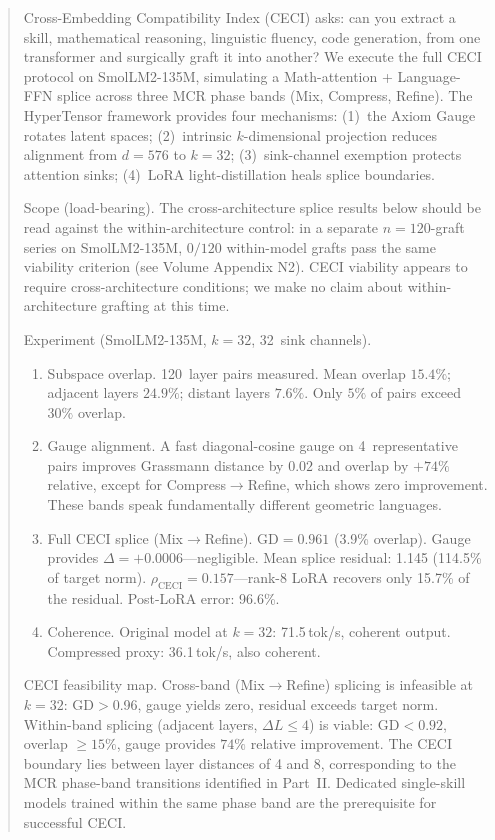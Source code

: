 \documentclass[11pt]{article}
\begin{document}
\hypertensorbanner

\begin{abstract}
\noindent
Cross-Embedding Compatibility Index (CECI) asks: can you extract a
skill, mathematical reasoning, linguistic fluency, code
generation, from one transformer and surgically graft it into another?
We execute the full CECI protocol on SmolLM2-135M, simulating a
Math-attention + Language-FFN splice across three MCR phase bands
(Mix, Compress, Refine). The HyperTensor framework provides four
mechanisms: (1)~the Axiom Gauge rotates latent spaces; (2)~intrinsic
$k$-dimensional projection reduces alignment from $d{=}576$ to
$k{=}32$; (3)~sink-channel exemption protects attention sinks;
(4)~LoRA light-distillation heals splice boundaries.

Scope (load-bearing). The cross-architecture splice
results below should be read against the within-architecture
control: in a separate $n{=}120$-graft series on SmolLM2-135M,
$0/120$ within-model grafts pass the same viability criterion
(see Volume Appendix N2). CECI viability appears to require
cross-architecture conditions; we make no claim about
within-architecture grafting at this time.

Experiment (SmolLM2-135M, $k=32$, 32~sink channels).
\begin{enumerate}
\item Subspace overlap. 120~layer pairs measured. Mean
 overlap $15.4\%$; adjacent layers $24.9\%$; distant layers
 $7.6\%$. Only $5\%$ of pairs exceed $30\%$ overlap.
\item Gauge alignment. A fast diagonal-cosine gauge on
 4~representative pairs improves Grassmann distance by $0.02$
 and overlap by $+74\%$ relative, except for
 Compress$\to$Refine, which shows zero improvement.
 These bands speak fundamentally different geometric languages.
\item Full CECI splice (Mix$\to$Refine). GD$=0.961$
 (3.9\% overlap). Gauge provides $\Delta{=}{+}0.0006$---negligible.
 Mean splice residual: 1.145 (114.5\% of target norm).
 $\rho_{\mathrm{CECI}}{=}0.157$---rank-8 LoRA recovers only
 15.7\% of the residual. Post-LoRA error: 96.6\%.
\item Coherence. Original model at $k{=}32$: 71.5\,tok/s,
 coherent output. Compressed proxy: 36.1\,tok/s, also coherent.
\end{enumerate}

CECI feasibility map. Cross-band (Mix$\to$Refine) splicing
is infeasible at $k=32$: GD$>$0.96, gauge yields zero,
residual exceeds target norm. Within-band splicing (adjacent
layers, $\Delta L{\le}4$) is viable: GD${<}0.92$, overlap
${\ge}15\%$, gauge provides $74\%$ relative improvement. The CECI
boundary lies between layer distances of 4 and 8, corresponding to
the MCR phase-band transitions identified in Part~II. Dedicated
single-skill models trained within the same phase band are the
prerequisite for successful CECI.
\end{abstract}
\end{document}
